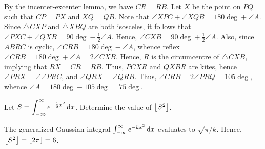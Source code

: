 \begin{center}
\end{center}

By the incenter-excenter lemma, we have $CR = RB$. Let $X$ be the point on $PQ$ such that $CP = PX$ and $XQ = QB$. Note that $\angle XPC + \angle XQB = 180\deg + \angle A$. Since $\triangle CXP$ and $\triangle XBQ$ are both isosceles, it follows that $\angle PXC + \angle QXB = 90\deg - \frac12 \angle A$. Hence, $\angle CXB = 90\deg + \frac12 \angle A$. Also, since $ABRC$ is cyclic, $\angle CRB = 180\deg - \angle A$, whence reflex $\angle CRB = 180 \deg + \angle A = 2\angle CXB$. Hence, $R$ is the circumcentre of $\triangle CXB$, implying that $RX = CR = RB$. Thus, $PCXR$ and $QXBR$ are kites, hence $\angle PRX = \angle \angle PRC$, and $\angle QRX = \angle QRB$. Thus, $\angle CRB = 2\angle PRQ = 105\deg$, whence $\angle A = 180\deg - 105\deg = 75\deg$.

\begin{question}[6]\label{A::2021-O-1-24}
    Let $S = \displaystyle\int_{-\infty}^\infty e^{-\frac12 x^2} \mathop{\mathrm{d}x}$. Determine the value of $\left\lfloor S^2 \right\rfloor$.
\end{question}

The generalized Gaussian integral $\int_{-\infty}^\infty e^{-k x^2} \mathop{\mathrm{d}x}$ evaluates to $\sqrt{\pi/k}$. Hence, $\left\lfloor S^2 \right\rfloor = \left\lfloor 2\pi \right\rfloor = 6$.

